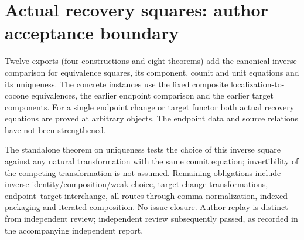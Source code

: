\documentclass{article}
\begin{document}
\section*{Actual recovery squares: author acceptance boundary}
Twelve exports (four constructions and eight theorems) add the canonical inverse comparison for equivalence squares, its component, counit and unit equations and its uniqueness. The concrete instances use the fixed composite localization-to-cocone equivalences, the earlier endpoint comparison and the earlier target components. For a single endpoint change or target functor both actual recovery equations are proved at arbitrary objects. The endpoint data and source relations have not been strengthened.

The standalone theorem on uniqueness tests the choice of this inverse square against any natural transformation with the same counit equation; invertibility of the competing transformation is not assumed. Remaining obligations include inverse identity/composition/weak-choice, target-change transformations, endpoint--target interchange, all routes through comma normalization, indexed packaging and iterated composition. No issue closure. Author replay is distinct from independent review; independent review subsequently passed, as recorded in the accompanying independent report.
\end{document}
